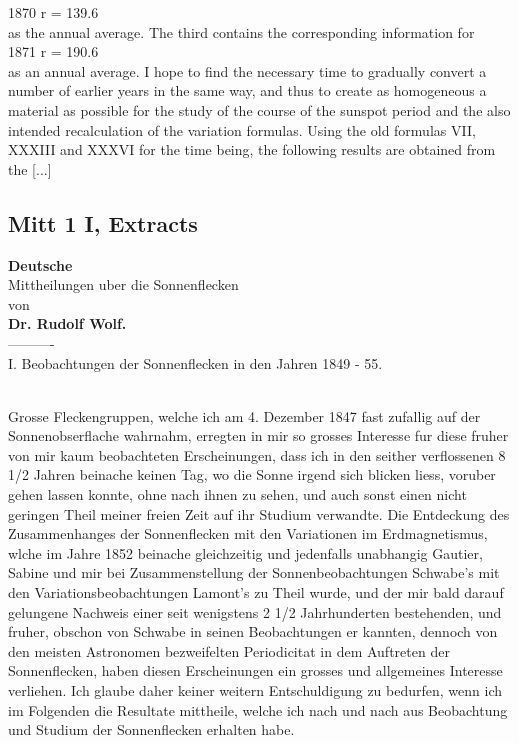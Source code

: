 \documentclass[12pt]{article}
\begin{document}
1870 r = 139.6\\

as the annual average. The third contains the corresponding information for\\

1871 r = 190.6\\

as an annual average. I hope to find the necessary time to gradually convert a number of earlier years in the same way, and thus to create as homogeneous a material as possible for the study of the course of the sunspot period and the also intended recalculation of the variation formulas. Using the old formulas VII, XXXIII and XXXVI for the time being, the following results are obtained from the [...]\\

\subsection{Mitt 1 I, Extracts}\label{mitt:rub 1}
{\centering
\textbf{Deutsche}\\
\huge{Mittheilungen uber die Sonnenflecken}\\
\footnotesize{von}\\
\textbf{Dr. Rudolf Wolf.}\\
----------\\
\footnotesize{I. Beobachtungen der Sonnenflecken in den Jahren 1849 - 55.}
\par
}\\
Grosse Fleckengruppen, welche ich am 4. Dezember 1847 fast zufallig auf der Sonnenobserflache wahrnahm, erregten in mir so grosses Interesse fur diese fruher von mir kaum beobachteten Erscheinungen, dass ich in den seither verflossenen 8 1/2 Jahren beinache keinen Tag, wo die Sonne irgend sich blicken liess, voruber gehen lassen konnte, ohne nach ihnen zu sehen, und auch sonst einen nicht geringen Theil meiner freien Zeit auf ihr Studium verwandte. Die Entdeckung des Zusammenhanges der Sonnenflecken mit den Variationen im Erdmagnetismus, wlche im Jahre 1852 beinache gleichzeitig und jedenfalls unabhangig Gautier, Sabine und mir bei Zusammenstellung der Sonnenbeobachtungen Schwabe's mit den Variationsbeobachtungen Lamont's zu Theil wurde, und der mir bald darauf gelungene Nachweis einer seit wenigstens 2 1/2 Jahrhunderten bestehenden, und fruher, obschon von Schwabe in seinen Beobachtungen er kannten, dennoch von den meisten Astronomen bezweifelten Periodicitat in dem Auftreten der Sonnenflecken, haben diesen Erscheinungen ein grosses und allgemeines Interesse verliehen. Ich glaube daher keiner weitern Entschuldigung zu bedurfen, wenn ich im Folgenden die Resultate mittheile, welche ich nach und nach aus Beobachtung und Studium der Sonnenflecken erhalten habe. \\
\end{document}
